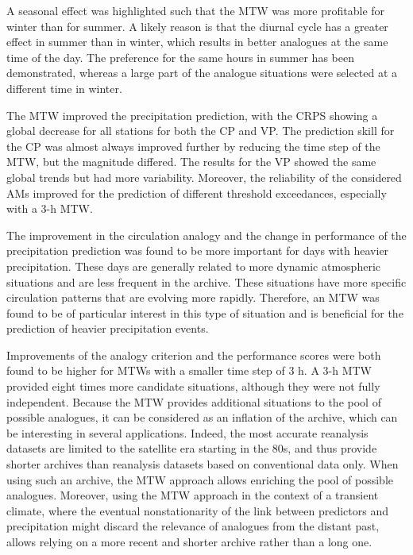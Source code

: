 \documentclass[hess, manuscript]{copernicus}
\begin{document}
	A seasonal effect was highlighted such that the MTW was more profitable for winter than for summer. A likely reason is that the diurnal cycle has a greater effect in summer than in winter, which results in better analogues at the same time of the day. The preference for the same hours in summer has been demonstrated, whereas a large part of the analogue situations were selected at a different time in winter.
	
	The MTW improved the precipitation prediction, with the CRPS showing a global decrease for all stations for both the CP and VP. The prediction skill for the CP was almost always improved further by reducing the time step of the MTW, but the magnitude differed. The results for the VP showed the same global trends but had more variability. Moreover, the reliability of the considered AMs improved for the prediction of different threshold exceedances, especially with a 3-h MTW.
	
	The improvement in the circulation analogy and the change in performance of the precipitation prediction was found to be more important for days with heavier precipitation. These days are generally related to more dynamic atmospheric situations and are less frequent in the archive. These situations have more specific circulation patterns that are evolving more rapidly. Therefore, an MTW was found to be of particular interest in this type of situation and is beneficial for the prediction of heavier precipitation events.
		
	Improvements of the analogy criterion and the performance scores were both found to be higher for MTWs with a smaller time step of 3 h. A 3-h MTW provided eight times more candidate situations, although they were not fully independent. Because the MTW provides additional situations to the pool of possible analogues, it can be considered as an inflation of the archive, which can be interesting in several applications. Indeed, the most accurate reanalysis datasets are limited to the satellite era starting in the 80s, and thus provide shorter archives than reanalysis datasets based on conventional data only. When using such an archive, the MTW approach allows enriching the pool of possible analogues. Moreover, using the MTW approach in the context of a transient climate, where the eventual nonstationarity of the link between predictors and precipitation might discard the relevance of analogues from the distant past, allows relying on a more recent and shorter archive rather than a long one.
	
\end{document}
